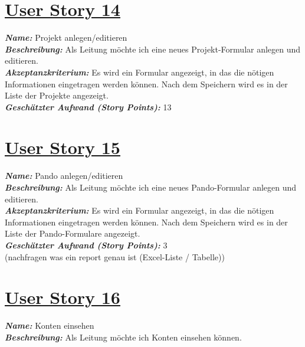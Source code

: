\documentclass[12pt]{article}%
\begin{document}
\section*{\large \underline{User Story 14}}
\textit{\textbf{Name:}} Projekt anlegen/editieren
\\

\textbf{\textit{Beschreibung:}} Als Leitung möchte ich eine neues Projekt-Formular anlegen und editieren.
\\

\textbf{\textit{Akzeptanzkriterium:}} Es wird ein Formular angezeigt, in das die nötigen Informationen eingetragen werden können. Nach dem Speichern wird es in der Liste der Projekte angezeigt.
\\

\textbf{\textit{Geschätzter Aufwand (Story Points):}} 13
\\


\section*{\large \underline{User Story 15}}
\textit{\textbf{Name:}} Pando anlegen/editieren
\\

\textbf{\textit{Beschreibung:}} Als Leitung möchte ich eine neues Pando-Formular anlegen und editieren.
\\

\textbf{\textit{Akzeptanzkriterium:}} Es wird ein Formular angezeigt, in das die nötigen Informationen eingetragen werden können. Nach dem Speichern wird es in der Liste der Pando-Formulare angezeigt.
\\

\textbf{\textit{Geschätzter Aufwand (Story Points):}} 3
\\


(nachfragen was ein report genau ist (Excel-Liste / Tabelle))
\section*{\large \underline{User Story 16}}
\textit{\textbf{Name:}} Konten einsehen
\\

\textbf{\textit{Beschreibung:}} Als Leitung möchte ich Konten einsehen können.
\\
\end{document}
